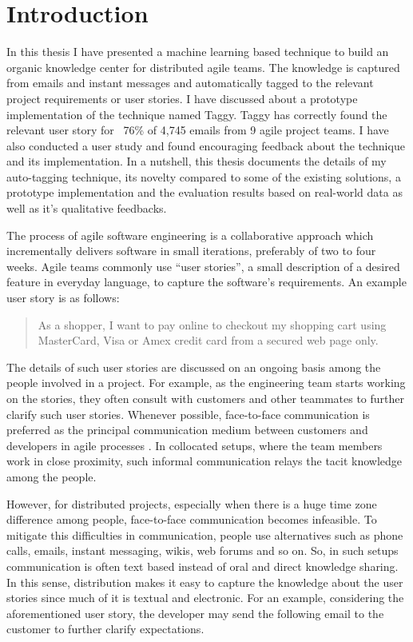 \fancyhead[RO,LE]{\thepage}
\fancyfoot{} 
\chapter{Introduction}
In this thesis I have presented a machine learning based technique to build an organic knowledge center for distributed agile teams. The knowledge is captured from emails and instant messages and automatically tagged to the relevant project requirements or user stories. I have discussed about a prototype implementation of the technique named Taggy. Taggy has correctly found the relevant user story for ~76\% of 4,745 emails from 9 agile project teams. I have also conducted a user study and found encouraging feedback about the technique and its implementation. In a nutshell, this thesis documents the details of my auto-tagging technique, its novelty compared to some of the existing solutions, a prototype implementation and the evaluation results based on real-world data as well as it's qualitative feedbacks.

The process of agile software engineering is a collaborative approach which incrementally delivers software in small iterations, preferably of two to four weeks. Agile teams commonly use ``user stories'', a small description of a desired feature in everyday language, to capture the software's requirements. An example user story is as follows:\\
\begin{quote}
As a shopper, I want to pay online to checkout my shopping cart using MasterCard, Visa or Amex credit card from a secured web page only.
\end{quote}
The details of such user stories are discussed on an ongoing basis among the people involved in a project. For example, as the engineering team starts working on the stories, they often consult with customers and other teammates to further clarify such user stories. Whenever possible, face-to-face communication is preferred as the principal communication medium between customers and developers in agile processes \cite{am, xp, scrum, xp_up}. In collocated setups, where the team members work in close proximity, such informal communication relays the tacit knowledge among the people. 

However, for distributed projects, especially when there is a huge time zone difference among people, face-to-face communication becomes infeasible. To mitigate this difficulties in communication, people use alternatives such as phone calls, emails, instant messaging, wikis, web forums and so on. So, in such setups communication is often text based instead of oral and direct knowledge sharing. In this sense, distribution makes it easy to capture the knowledge about the user stories since much of it is textual and electronic. For an example, considering the aforementioned user story, the developer may send the following email to the customer to further clarify expectations.\\

